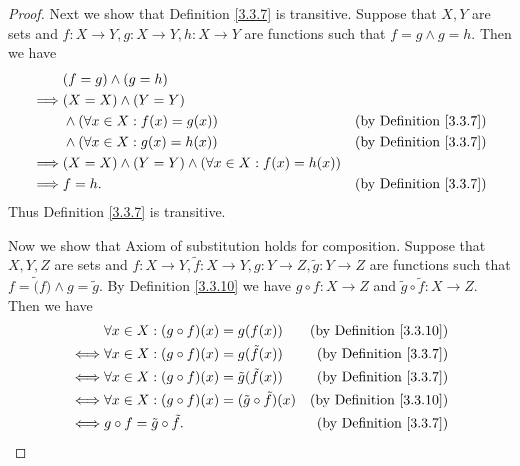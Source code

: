 \begin{proof}
    Next we show that Definition \ref{3.3.7} is transitive.
    Suppose that \(X, Y\) are sets and \(f : X \to Y, g : X \to Y, h : X \to Y\) are functions such that \(f = g \land g = h\).
    Then we have
    \begin{align*}
                 & (f = g) \land (g = h)                                                                            \\
        \implies & (X = X) \land (Y = Y)                                                                            \\
                 & \land (\forall x \in X : f(x) = g(x))                       & \text{(by Definition \ref{3.3.7})} \\
                 & \land (\forall x \in X : g(x) = h(x))                       & \text{(by Definition \ref{3.3.7})} \\
        \implies & (X = X) \land (Y = Y) \land (\forall x \in X : f(x) = h(x))                                      \\
        \implies & f = h.                                                      & \text{(by Definition \ref{3.3.7})}
    \end{align*}
    Thus Definition \ref{3.3.7} is transitive.

    Now we show that Axiom of substitution holds for composition.
    Suppose that \(X, Y, Z\) are sets and \(f : X \to Y, \tilde{f} : X \to Y, g : Y \to Z, \tilde{g} : Y \to Z\) are functions such that \(f = \tilde(f) \land g = \tilde{g}\).
    By Definition \ref{3.3.10} we have \(g \circ f : X \to Z\) and \(\tilde{g} \circ \tilde{f} : X \to Z\).
    Then we have
    \begin{align*}
             & \forall x \in X : (g \circ f)(x) = g(f(x))                        & \text{(by Definition \ref{3.3.10})} \\
        \iff & \forall x \in X : (g \circ f)(x) = g(\tilde{f}(x))                & \text{(by Definition \ref{3.3.7})}  \\
        \iff & \forall x \in X : (g \circ f)(x) = \tilde{g}(\tilde{f}(x))        & \text{(by Definition \ref{3.3.7})}  \\
        \iff & \forall x \in X : (g \circ f)(x) = (\tilde{g} \circ \tilde{f})(x) & \text{(by Definition \ref{3.3.10})} \\
        \iff & g \circ f = \tilde{g} \circ \tilde{f}.                            & \text{(by Definition \ref{3.3.7})}
    \end{align*}
\end{proof}

